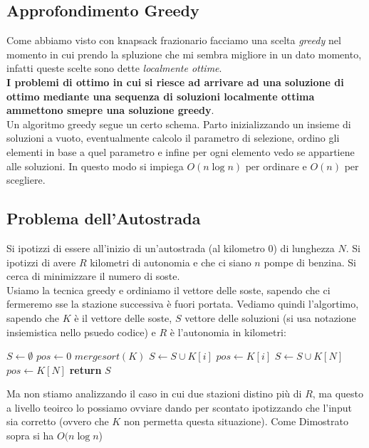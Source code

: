 \documentclass[a4paper,12pt, oneside]{book}
\begin{document}
\subsection{Approfondimento Greedy}
Come abbiamo visto con knapsack frazionario facciamo una scelta
\textit{greedy} nel momento in cui prendo la spluzione che mi sembra
migliore in un dato momento, infatti queste scelte sono dette
\textit{localmente ottime}.\\
\textbf{I problemi di ottimo in cui si riesce ad arrivare ad una soluzione di
  ottimo mediante una sequenza di soluzioni localmente ottima
  ammettono smepre una soluzione greedy}.\\
Un algoritmo greedy segue un certo schema. Parto inizializzando un insieme
di soluzioni a vuoto, eventualmente calcolo il parametro di selezione,
ordino gli elementi in base a quel parametro e infine per ogni
elemento vedo se appartiene alle soluzioni. In questo modo si impiega
$O(n\log n)$ per ordinare e $O(n)$ per scegliere.\\
\subsection{Problema dell'Autostrada}
Si ipotizzi di essere all'inizio di un'autostrada (al kilometro 0) di
lunghezza $N$. Si ipotizzi di avere $R$ kilometri di autonomia e che
ci siano $n$ pompe di benzina. Si cerca di minimizzare il numero di
soste.\\
Usiamo la tecnica greedy e ordiniamo il vettore delle soste, sapendo
che ci fermeremo sse la stazione successiva è fuori portata. Vediamo
quindi l'algortimo, sapendo che $K$ è il vettore delle soste, $S$
vettore delle soluzioni (si usa notazione insiemistica nello psuedo
codice) e $R$ è l'autonomia in kilometri:
\begin{algorithm}
  \begin{algorithmic}
    \State $S\gets \emptyset$
    \State $pos\gets 0$
    \State $mergesort(K)$
    \State $S\gets S\cup K[i]$
    \State $pos \gets K[i]$
    \EndIf
    \EndFor
    \State $S\gets S\cup K[N]$
    \State $pos \gets K[N]$
    \EndIf
    \State \textbf{return }$S$
    \EndFunction
  \end{algorithmic}
\end{algorithm}
Ma non stiamo analizzando il caso in cui due stazioni distino più di
$R$, ma questo a livello teoirco lo possiamo ovviare dando per
scontato ipotizzando che l'input sia corretto (ovvero che $K$ non
permetta questa situazione). Come Dimostrato sopra si ha $O(n\log n$)
\end{document}
